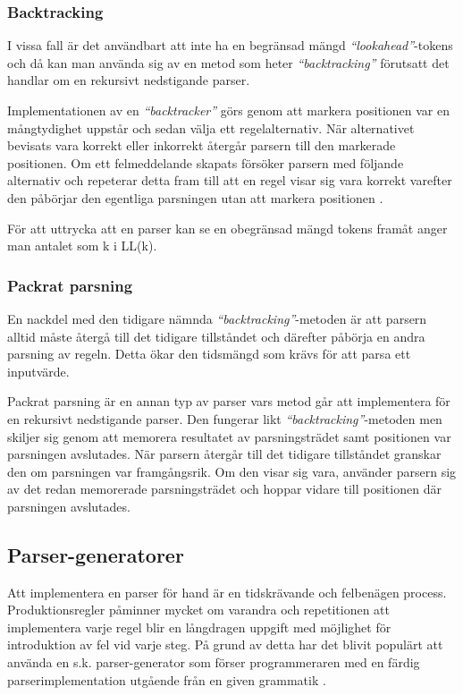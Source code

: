 \subsubsection{Backtracking}

I vissa fall är det användbart att inte ha en begränsad mängd
\textit{``lookahead''}-tokens och då kan man använda sig av en metod som heter
\textit{``backtracking''} förutsatt det handlar om en rekursivt nedstigande
parser.

Implementationen av en \textit{``backtracker''} görs genom att markera
positionen var en mångtydighet uppstår och sedan välja ett regelalternativ.
När alternativet bevisats vara korrekt eller inkorrekt återgår parsern till
den markerade positionen. Om ett felmeddelande skapats försöker parsern med
följande alternativ och repeterar detta fram till att en regel visar sig vara
korrekt varefter den påbörjar den egentliga parsningen utan att markera
positionen \citep[s. 57]{pt10}.

För att uttrycka att en parser kan se en obegränsad mängd tokens framåt anger
man antalet som k i LL(k).

\subsubsection{Packrat parsning}

En nackdel med den tidigare nämnda \textit{``backtracking''}-metoden är att
parsern alltid måste återgå till det tidigare tillståndet och därefter påbörja
en andra parsning av regeln. Detta ökar den tidsmängd som krävs för att parsa
ett inputvärde.

Packrat parsning är en annan typ av parser vars metod går att implementera för
en rekursivt nedstigande parser. Den fungerar likt
\textit{``backtracking''}-metoden men skiljer sig genom att memorera
resultatet av parsningsträdet samt positionen var parsningen avslutades. När
parsern återgår till det tidigare tillståndet granskar den om parsningen var
framgångsrik. Om den visar sig vara, använder parsern sig av det redan
memorerade parsningsträdet och hoppar vidare till positionen där parsningen
avslutades.

\subsection{Parser-generatorer}

Att implementera en parser för hand är en tidskrävande och felbenägen process.
Produktionsregler påminner mycket om varandra och repetitionen att
implementera varje regel blir en långdragen uppgift med möjlighet för
introduktion av fel vid varje steg. På grund av detta har det blivit populärt
att använda en s.k. parser-generator som förser programmeraren med en färdig
parserimplementation utgående från en given grammatik \citep[s. 26]{pt10}.

